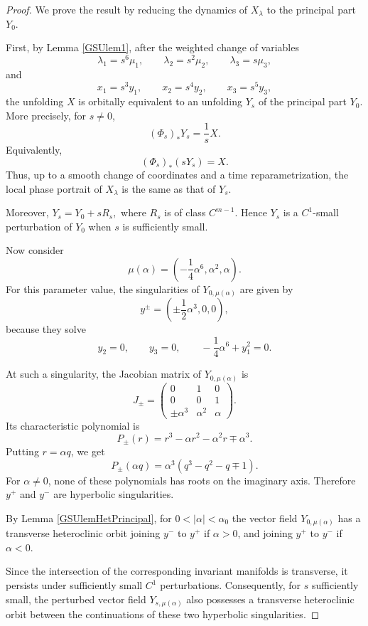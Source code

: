 \documentclass[12pt]{article}
\newtheorem{remark definition}{Remark Definition}[section]
\begin{document}
\begin{proof}
	We prove the result by reducing the dynamics of $X_\lambda$ to the
	principal part $Y_0$.
	
	First, by Lemma \ref{GSUlem1}, after the weighted change of variables
	$$
	\lambda_1=s^6\mu_1,
	\qquad
	\lambda_2=s^2\mu_2,
	\qquad
	\lambda_3=s\mu_3,
	$$
	and
	$$
	x_1=s^3y_1,
	\qquad
	x_2=s^4y_2,
	\qquad
	x_3=s^5y_3,
	$$
	the unfolding $X$ is orbitally equivalent to an unfolding $Y_s$ of the
	principal part $Y_0$. More precisely, for $s\neq 0$,
	$$
	(\Phi_s)_*Y_s=\frac{1}{s}X.
	$$
	Equivalently,
	$$
	(\Phi_s)_*(sY_s)=X.
	$$
	Thus, up to a smooth change of coordinates and a time reparametrization,
	the local phase portrait of $X_\lambda$ is the same as that of $Y_s$.
	
	Moreover, $Y_s=Y_0+	sR_s,$
	where $R_s$ is of class $C^{m-1}$. Hence $Y_s$ is a $C^1$-small
	perturbation of $Y_0$ when $s$ is sufficiently small.
	
	Now consider
	$$
	\mu(\alpha)
	=
	\left(
	-\frac14\alpha^6,\alpha^2,\alpha
	\right).
	$$
	For this parameter value, the singularities of $Y_{0,\mu(\alpha)}$ are
	given by
	$$
	y^\pm
	=
	\left(
	\pm\frac12\alpha^3,0,0
	\right),
	$$
	because they solve
	$$
	y_2=0,\qquad y_3=0,\qquad
	-\frac14\alpha^6+y_1^2=0.
	$$
	
	At such a singularity, the Jacobian matrix of $Y_{0,\mu(\alpha)}$ is
	$$
	J_\pm
	=
	\begin{pmatrix}
		0 & 1 & 0\\
		0 & 0 & 1\\
		\pm \alpha^3 & \alpha^2 & \alpha
	\end{pmatrix}.
	$$
	Its characteristic polynomial is
	$$
	P_\pm(r)
	=
	r^3-\alpha r^2-\alpha^2r\mp \alpha^3.
	$$
	Putting $r=\alpha q$, we get
	$$
	P_\pm(\alpha q)
	=
	\alpha^3
	\left(
	q^3-q^2-q\mp 1
	\right).
	$$
	For $\alpha\neq 0$, none of these polynomials has roots on the imaginary
	axis. Therefore $y^+$ and $y^-$ are hyperbolic singularities.
	
	By Lemma \ref{GSUlemHetPrincipal}, for $0<|\alpha|<\alpha_0$ the vector
	field $Y_{0,\mu(\alpha)}$ has a transverse heteroclinic orbit joining
	$y^-$ to $y^+$ if $\alpha>0$, and joining $y^+$ to $y^-$ if $\alpha<0$.
	
	Since the intersection of the corresponding invariant manifolds is
	transverse, it persists under sufficiently small $C^1$ perturbations.
	Consequently, for $s$ sufficiently small, the perturbed vector field
	$Y_{s,\mu(\alpha)}$ also possesses a transverse heteroclinic orbit between
	the continuations of these two hyperbolic singularities.
	

\end{proof}
\end{document}
